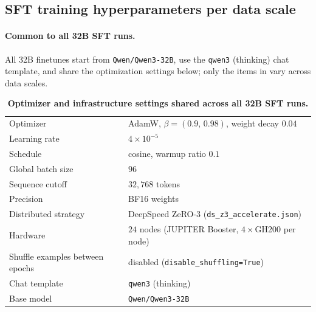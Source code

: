 
\subsection{SFT training hyperparameters per data scale}
\label{appx:sft_hp_per_scale}

\paragraph{Common to all 32B SFT runs.}
All 32B finetunes start from \texttt{Qwen/Qwen3-32B}, use the \texttt{qwen3} (thinking)
chat template, and share the optimization settings below; only the items in
 vary across data scales.

\begin{table}[!htbp]
\centering
\begin{tabular}{ll}
\toprule
Optimizer                          & AdamW, $\beta = (0.9,\,0.98)$, weight decay $0.04$ \\
Learning rate                      & $4\times10^{-5}$ \\
Schedule                           & cosine, warmup ratio $0.1$ \\
Global batch size                  & $96$ \\
Sequence cutoff                    & $32{,}768$ tokens \\
Precision                          & BF16 weights \\
Distributed strategy               & DeepSpeed ZeRO-3 (\texttt{ds\_z3\_accelerate.json}) \\
Hardware                           & $24$ nodes (JUPITER Booster, $4\times$GH200 per node) \\
Shuffle examples between epochs    & disabled (\texttt{disable\_shuffling=True}) \\
Chat template                      & \texttt{qwen3} (thinking) \\
Base model                         & \texttt{Qwen/Qwen3-32B} \\
\bottomrule
\end{tabular}
\vspace{6pt}
\caption{\textbf{Optimizer and infrastructure settings shared across all 32B SFT runs.}}
\label{tab:sft_hp_common_32b}
\end{table}


